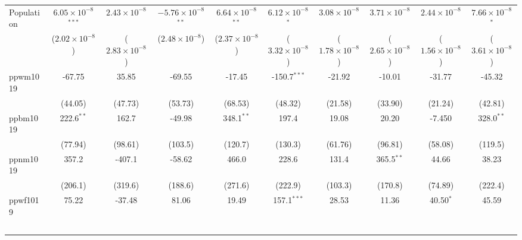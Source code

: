 \documentclass{article}
\begin{document}
\begin{landscape}
\begin{longtable}{@{\extracolsep{5pt}}lccccccccc}
   Population             & $6.05\times 10^{-8}$$^{***}$  & $2.43\times 10^{-8}$    & $-5.76\times 10^{-8}$$^{**}$  & $6.64\times 10^{-8}$$^{**}$  & $6.12\times 10^{-8}$$^{*}$  & $3.08\times 10^{-8}$         & $3.71\times 10^{-8}$    & $2.44\times 10^{-8}$          & $7.66\times 10^{-8}$$^{*}$\\    
                        & ($2.02\times 10^{-8}$)        & ($2.83\times 10^{-8}$)  & ($2.48\times 10^{-8}$)        & ($2.37\times 10^{-8}$)       & ($3.32\times 10^{-8}$)      & ($1.78\times 10^{-8}$)       & ($2.65\times 10^{-8}$)  & ($1.56\times 10^{-8}$)        & ($3.61\times 10^{-8}$)\\    
   ppwm1019             & -67.75                        & 35.85                   & -69.55                        & -17.45                       & -150.7$^{***}$              & -21.92                       & -10.01                  & -31.77                        & -45.32\\   
                        & (44.05)                       & (47.73)                 & (53.73)                       & (68.53)                      & (48.32)                     & (21.58)                      & (33.90)                 & (21.24)                       & (42.81)\\   
   ppbm1019             & 222.6$^{**}$                  & 162.7                   & -49.98                        & 348.1$^{**}$                 & 197.4                       & 19.08                        & 20.20                   & -7.450                        & 328.0$^{**}$\\   
                        & (77.94)                       & (98.61)                 & (103.5)                       & (120.7)                      & (130.3)                     & (61.76)                      & (96.81)                 & (58.08)                       & (119.5)\\   
   ppnm1019             & 357.2                         & -407.1                  & -58.62                        & 466.0                        & 228.6                       & 131.4                        & 365.5$^{**}$            & 44.66                         & 38.23\\   
                        & (206.1)                       & (319.6)                 & (188.6)                       & (271.6)                      & (222.9)                     & (103.3)                      & (170.8)                 & (74.89)                       & (222.4)\\   
   ppwf1019             & 75.22                         & -37.48                  & 81.06                         & 19.49                        & 157.1$^{***}$               & 28.53                        & 11.36                   & 40.50$^{*}$                   & 45.59\\   
$$
\end{longtable}
\end{landscape}
\end{document}
